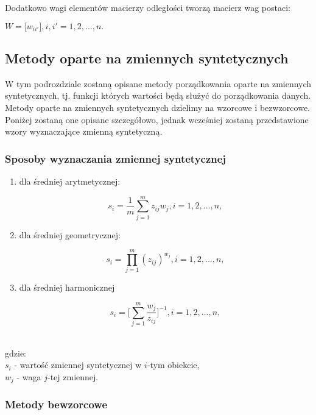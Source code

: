 \documentclass[12pt,a4paper]{report}
\begin{document}
Dodatkowo wagi elementów macierzy odległości tworzą macierz wag postaci:

\begin{center}
$W=\lbrack{w_{ii'}\rbrack}, i,i'=1, 2, ..., n.$
\end{center}



\newpage
\subsection{Metody oparte na zmiennych syntetycznych}

W tym podrozdziale zostaną opisane metody porządkowania oparte na zmiennych syntetycznych, tj. funkcji których wartości będą służyć do porządkowania danych. Metody oparte na zmiennych syntetycznych dzielimy na wzorcowe i bezwzorcowe. Poniżej zostaną one opisane szczegółowo, jednak wcześniej zostaną przedstawione wzory wyznaczające zmienną syntetyczną. \\

\subsubsection{Sposoby wyznaczania zmiennej syntetycznej}

\begin{enumerate}
\item dla średniej arytmetycznej:
\begin{center}
$$s_{i}=\frac{1}{m} \sum_{j=1}^{m} z_{ij}w_{j}, i=1, 2, ..., n,$$
\end{center}
\item dla średniej geometrycznej:
\begin{center}
$$s_{i}=\prod_{j=1}^{m} (z_{ij})^{w_{j}}, i=1, 2, ..., n,$$
\end{center}
\item dla średniej harmonicznej
\begin{center}
$$s_{i}=\big[\sum_{j=1}^{m} \frac{w_{j}}{z_{ij}}\big]^{-1}, i=1, 2, ..., n,$$\\
\end{center}
\end{enumerate}
gdzie:\\
$s_{i}$ - wartość zmiennej syntetycznej w $i$-tym obiekcie,\\
$w_{j}$ - waga $j$-tej zmiennej.

\subsubsection{Metody bewzorcowe}
\noindent
\end{document}
